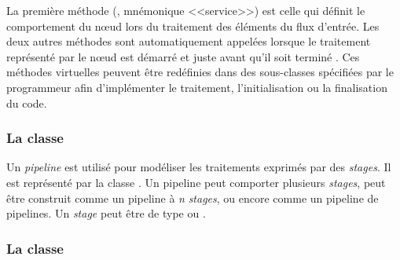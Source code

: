 La premi\`ere m\'ethode (, mn\'emonique <<service>>) est celle qui d\'efinit le comportement du nœud lors du traitement des \'el\'ements du flux d'entr\'ee. Les deux autres m\'ethodes sont automatiquement appel\'ees lorsque le traitement repr\'esent\'e par le nœud est d\'emarr\'e  et juste avant qu'il soit termin\'e . Ces m\'ethodes virtuelles peuvent \^etre red\'efinies dans des sous-classes  sp\'ecifi\'ees par le programmeur afin d'impl\'ementer le traitement, l'initialisation ou la finalisation du code.


\subsubsection*{La classe }

Un \emph{pipeline} est utilis\'e pour mod\'eliser les traitements exprim\'es par des \emph{stages}. Il est repr\'esent\'e par la classe . Un {pipeline} peut comporter plusieurs \emph{stages}, peut \^etre construit comme un pipeline \`a \emph{n} \emph{stages}, ou encore comme un {pipeline} de {pipelines}. Un \emph{stage} peut \^etre de type  ou .


\goodbreak

\subsubsection*{La classe }
\label{farm.sect}

